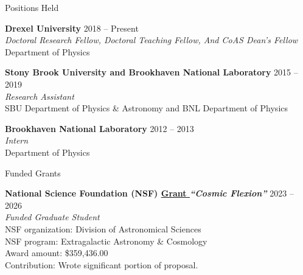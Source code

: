 \documentclass{resume} %
\begin{document}
\begin{rSection}{Positions Held}

\textbf{Drexel University} \hfill {2018 -- Present} \\
\textit{Doctoral Research Fellow, Doctoral Teaching Fellow, And CoAS Dean's Fellow}\\
Department of Physics

\textbf{Stony Brook University and Brookhaven National Laboratory} \hfill {2015 -- 2019}\\
\textit{Research Assistant}\\
SBU Department of Physics \& Astronomy  and BNL Department of Physics

\textbf{Brookhaven National Laboratory} \hfill {2012 -- 2013}\\
\textit{Intern}\\
Department of Physics

\end{rSection}


\begin{rSection}{Funded Grants}

\textbf{National Science Foundation (NSF) \href{https://www.nsf.gov/awardsearch/showAward?AWD_ID=2306989&HistoricalAwards=false}{Grant } \textit{``Cosmic Flexion''}} \hfill {2023 -- 2026} \\
\textit{Funded Graduate Student}\\
NSF organization: Division of Astronomical Sciences\\
NSF program: Extragalactic Astronomy \& Cosmology\\
Award amount: \$359,436.00\\
Contribution: Wrote significant portion of proposal.


\end{rSection}

\end{document}
